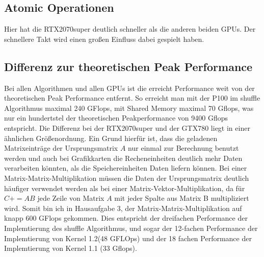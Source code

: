 \documentclass[10pt,a4paper]{article}
\begin{document}
	  \subsection{Atomic Operationen}
	  Hier hat die RTX2070super deutlich schneller als die anderen beiden GPUs. Der schnellere Takt wird einen großen Einfluss dabei gespielt haben.
	  \subsection{Differenz zur theoretischen Peak Performance}
	  Bei allen Algorithmen und allen GPUs ist die erreicht Performance weit von der theoretischen Peak Performance entfernt. So erreicht man mit der P100 im shuffle Algorithmus maximal 240 GFlops, mit Shared Memory maximal 70 Gflops, was nur ein hundertstel der theoretischen Peakperformance von 9400 Gflops entspricht. Die Differenz bei der RTX2070super und der GTX780 liegt in einer ähnlichen Größenordnung. Ein Grund hierfür ist, dass die geladenen Matrixeinträge der Ursprungsmatrix $A$ nur einmal zur Berechnung benutzt werden und auch bei Grafikkarten die Recheneinheiten deutlich mehr Daten verarbeiten könnten, als die Speichereinheiten Daten liefern können. Bei einer Matrix-Matrix-Multiplikation müssen die Daten der Ursprungsmatrix deutlich häufiger verwendet werden als bei einer Matrix-Vektor-Multiplikation, da für $C+=AB$ jede Zeile von Matrix $A$ mit jeder Spalte aus Matrix B multipliziert wird. Somit bin ich in Hausaufgabe 3, der Matrix-Matrix-Multiplikation auf knapp 600 GFlops gekommen. Dies entspricht der dreifachen Performance der Implemtierung des shuffle Algorithmus, und sogar der 12-fachen Performance der Implemtierung von Kernel 1.2(48 GFLOps) und der 18 fachen Performance der Implemtierung von Kernel 1.1 (33 Gflops).
\end{document}
